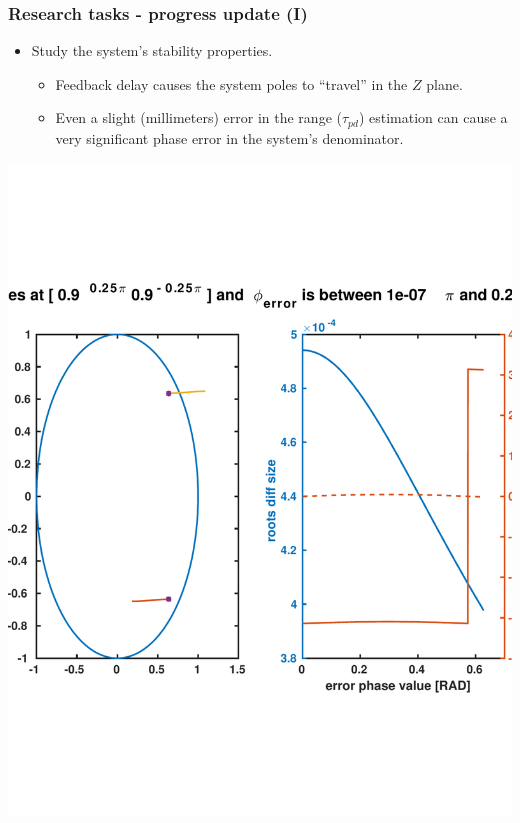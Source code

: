 \documentclass[10pt,pdflatex,headrule,landscape]{beamer}
\begin{document}
\begin{frame}
\frametitle{Research tasks - progress update (I)}
\begin{minipage}{0.45\textwidth}
\begin{itemize}
\item
{
Study the system's stability properties.
\begin{itemize}
\item{
Feedback delay causes the system poles to ``travel'' in the $ Z $ plane.
}
\item{
Even a slight (millimeters) error in the range ($ \tau_{pd} $) estimation can cause a very significant phase error in the system's denominator.
}  
\end{itemize}
}
\end{itemize}
\end{minipage}
\begin{minipage}{0.5\textwidth}
\includegraphics[width=\textwidth]{Media/notchRootLocus.pdf}
\end{minipage}
\end{frame}
\end{document}
